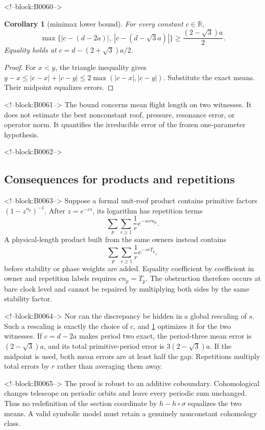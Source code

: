 \documentclass[11pt,a4paper]{article}
\newtheorem{corollary}[theorem]{Corollary}
\theoremstyle{definition}
\theoremstyle{remark}
\begin{document}
<!--block:B0060-->
\begin{corollary}[minimax lower bound]\label{cor:minimax}
For every constant \(c\in\mathbb R\),
\[
 \max\{|c-(d-2a)|,\ |c-(d-\sqrt3a)|\}
 \ge \frac{(2-\sqrt3)a}{2}.
\]
Equality holds at \(c=d-(2+\sqrt3)a/2\).
\end{corollary}
\begin{proof}
For \(x<y\), the triangle inequality gives
\(y-x\le|c-x|+|c-y|\le2\max(|c-x|,|c-y|)\). Substitute the exact means. Their midpoint equalizes errors.
\end{proof}

<!--block:B0061-->
The bound concerns mean flight length on two witnesses. It does not estimate the best nonconstant roof, pressure, resonance error, or operator norm. It quantifies the irreducible error of the frozen one-parameter hypothesis.

<!--block:B0062-->
\subsection{Consequences for products and repetitions}

<!--block:B0063-->
Suppose a formal unit-roof product contains primitive factors \((1-z^{n_p})^{-1}\). After \(z=e^{-cs}\), its logarithm has repetition terms
\[
 \sum_p\sum_{r\ge1}\frac{1}{r}e^{-scrn_p}.
\]
A physical-length product built from the same owners instead contains
\[
 \sum_p\sum_{r\ge1}\frac{1}{r}e^{-srT_p},
\]
before stability or phase weights are added. Equality coefficient by coefficient in owner and repetition labels requires \(cn_p=T_p\). The obstruction therefore occurs at bare clock level and cannot be repaired by multiplying both sides by the same stability factor.

<!--block:B0064-->
Nor can the discrepancy be hidden in a global rescaling of \(s\). Such a rescaling is exactly the choice of \(c\), and \cref{cor:minimax} optimizes it for the two witnesses. If \(c=d-2a\) makes period two exact, the period-three mean error is \((2-\sqrt3)a\), and its total primitive-period error is \(3(2-\sqrt3)a\). If the midpoint is used, both mean errors are at least half the gap. Repetitions multiply total errors by \(r\) rather than averaging them away.

<!--block:B0065-->
The proof is robust to an additive coboundary. Cohomological changes telescope on periodic orbits and leave every periodic sum unchanged. Thus no redefinition of the section coordinate by \(h-h\circ\sigma\) equalizes the two means. A valid symbolic model must retain a genuinely nonconstant cohomology class.
\end{document}
